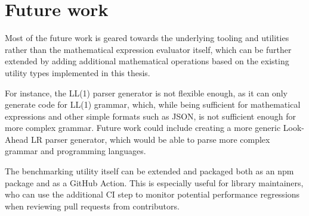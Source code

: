 \section{Future work}

Most of the future work is geared towards the underlying tooling and utilities rather than the mathematical expression evaluator itself, which can be further extended by adding additional mathematical operations based on the existing utility types implemented in this thesis.

For instance, the LL(1) parser generator is not flexible enough, as it can only generate code for LL(1) grammar, which, while being sufficient for mathematical expressions and other simple formats such as JSON, is not sufficient enough for more complex grammar. Future work could include creating a more generic Look-Ahead LR parser generator, which would be able to parse more complex grammar and programming languages.

The benchmarking utility itself can be extended and packaged both as an \acrshort{npm} package and as a GitHub Action. This is especially useful for library maintainers, who can use the additional CI step to monitor potential performance regressions when reviewing pull requests from contributors.
